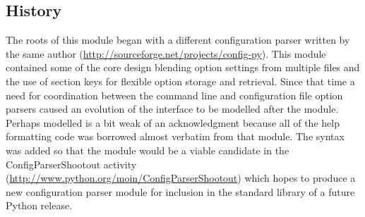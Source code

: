 \documentclass{howto}
\begin{document}
\subsection{History}

The roots of this module began with a different configuration parser written
by the same author (\url{http://sourceforge.net/projects/config-py}).  This 
module contained some of the core design blending option settings from multiple
files and the use of section keys for flexible option storage and retrieval.
Since that time a need for coordination between the command line and 
configuration file option parsers caused an evolution of the interface to be 
modelled after the  module.  Perhaps modelled is a bit weak of 
an acknowledgment because all of the help formatting code was borrowed almost 
verbatim from that module.  The  syntax was added so that the module 
would be a viable candidate in the ConfigParserShootout activity 
(\url{http://www.python.org/moin/ConfigParserShootout}) which hopes to produce a 
new configuration parser module for inclusion in the standard library of a 
future Python release.
\end{document}
